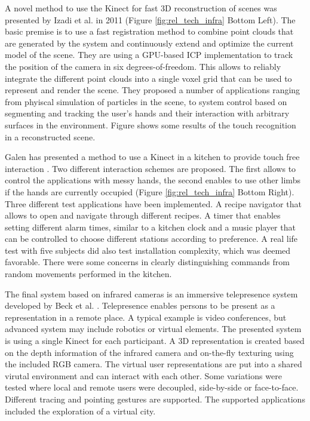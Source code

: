 A novel method to use the Kinect for fast 3D reconstruction of scenes was presented by Izadi et al. in 2011 \cite{Izadi2011} (Figure \ref{fig:rel_tech_infra} Bottom Left). The basic premise is to use a fast registration method to combine point clouds that are generated by the system and continuously extend and optimize the current model of the scene. They are using a GPU-based ICP implementation to track the position of the camera in six degrees-of-freedom. This allows to reliably integrate the different point clouds into a single voxel grid that can be used to represent and render the scene. They proposed a number of applications ranging from phyiscal simulation of particles in the scene, to system control based on segmenting and tracking the user's hands and their interaction with arbitrary surfaces in the environment. Figure  shows some results of the touch recognition in a reconstructed scene.

Galen has presented a method to use a Kinect in a kitchen to provide touch free interaction \cite{panger2012kinect}. Two different interaction schemes are proposed. The first allows to control the applications with messy hands, the second enables to use other limbs if the hands are currently occupied (Figure \ref{fig:rel_tech_infra} Bottom Right). Three different test applications have been implemented. A recipe navigator that allows to open and navigate through different recipes. A timer that enables setting different alarm times, similar to a kitchen clock and a music player that can be controlled to choose different stations according to preference. A real life test with five subjects  did also test installation complexity, which was deemed favorable. There were some concerns in clearly distinguishing commands from random movements performed in the kitchen.

The final system based on infrared cameras is an immersive telepresence system developed by Beck et al. \cite{beck2013immersive}. Telepresence enables persons to be present as a representation in a remote place. A typical example is video conferences, but advanced system may include robotics or virtual elements. The presented system is using a single Kinect for each participant. A 3D representation is created based on the depth information of the infrared camera and on-the-fly texturing using the included RGB camera. The virtual user representations are put into a shared virutal environment and can interact with each other. Some variations were tested where local and remote users were decoupled, side-by-side or face-to-face. Different tracing and pointing gestures are supported. The supported applications included the exploration of a virtual city.

